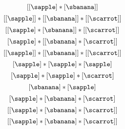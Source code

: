 {\begin{forslides}
        \begin{equation}
            \label{eq:fruit-sum-6}
            [ [ \sapple]   *  [\sbanana ] ]
        \end{equation}
        \begin{equation}
            \label{eq:fruit-sum-7}
            [ [ \sapple ] ] * [[ \sbanana ] ]  *  [[\scarrot]]
        \end{equation}
        \begin{equation}
            \label{eq:fruit-sum-7-bis}
            [ [ \sapple ]  * [ \sbanana ] ] *  [[\scarrot]]
        \end{equation}
        \begin{equation}
            \label{eq:fruit-sum-8}
            [ \sapple ]   *  [[ \sbanana ]  * [ \scarrot ]]
        \end{equation}
        \begin{equation}
            \label{eq:fruit-sum-9}
            [[ \sapple ]]  * [[ \sbanana ]] *  [[ \scarrot ]]
        \end{equation}
        \begin{equation}
            \label{eq:fruit-sum-10}
            [ \sapple ]   *  [ \sapple ]  *  [\sapple]
        \end{equation}
        \begin{equation}
            \label{eq:fruit-sum-11}
            [ \sapple ]   *  [ \sapple ]  * [ \scarrot ]
        \end{equation}
        \begin{equation}
            \label{eq:fruit-sum-12}
            [\sbanana ] * [ \sapple ]
        \end{equation}
        \begin{equation}
            \label{eq:fruit-sum-13}
            [ \sapple ]   *  [ \sbanana ]  *  [ \scarrot ]
        \end{equation}
        \begin{equation}
            \label{eq:fruit-sum-14}
            [ [ \sapple ]   *  [ \sbanana ]  *  [ \scarrot ] ]
        \end{equation}
        \begin{equation}
            \label{eq:fruit-sum-15}
            [ [ \sapple ]  *  [\sbanana]  *  [\scarrot ]  ]
        \end{equation}
        \begin{equation}
            \label{eq:fruit-sum-16}

\end{equation}
\end{forslides}}
